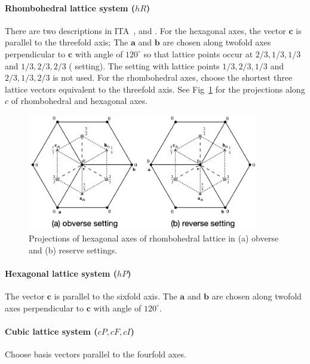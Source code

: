 \paragraph{Rhombohedral lattice system ($hR$)}
There are two descriptions in ITA~\cite{ITA2016},  and .
For the hexagonal axes, the vector $\bm{c}$ is parallel to the threefold axis;
The $\bm{a}$ and $\bm{b}$ are chosen along twofold axes perpendicular to $\bm{c}$ with angle of $120^{\circ}$ so that lattice points occur at $2/3, 1/3, 1/3$ and $1/3, 2/3, 2/3$ ( setting).
The  setting with lattice points $1/3, 2/3, 1/3$ and $2/3, 1/3, 2/3$ is not used.
For the rhombohedral axes, choose the shortest three lattice vectors equivalent to the threefold axis.
See Fig~\ref{fig:hexagonal_axes} for the projections along $c$ of rhombohedral and hexagonal axes.

\begin{figure}[htb]
  \centering
  \includegraphics[width=0.9\textwidth]{figure/fig_hexagonal_axes.png}
  \caption{Projections of hexagonal axes of rhombohedral lattice in (a) obverse and (b) reserve settings.}
  \label{fig:hexagonal_axes}
\end{figure}

\paragraph{Hexagonal lattice system ($hP$)}
The vector $\bm{c}$ is parallel to the sixfold axis.
The $\bm{a}$ and $\bm{b}$ are chosen along twofold axes perpendicular to $\bm{c}$ with angle of $120^{\circ}$.

\paragraph{Cubic lattice system ($cP, cF, cI$)}
Choose basis vectors parallel to the fourfold axes.

